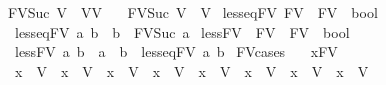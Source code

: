 \begin{isabellebody}
\ \ {\isachardoublequoteopen}FV{\isacharunderscore}{\kern0pt}Suc\ V{}\ {\isacharequal}{\kern0pt}\ {\isacharbraceleft}{\kern0pt}V{}{\isacharcomma}{\kern0pt}V{}{}{\isacharbraceright}{\kern0pt}{\isachardoublequoteclose}\ {\isacharbar}{\kern0pt}\isanewline
\ \ {\isachardoublequoteopen}FV{\isacharunderscore}{\kern0pt}Suc\ V{}{}\ {\isacharequal}{\kern0pt}\ {\isacharbraceleft}{\kern0pt}V{}{}{\isacharbraceright}{\kern0pt}{\isachardoublequoteclose}\isanewline
{}\isamarkupfalse%
\ less{\isacharunderscore}{\kern0pt}eq{\isacharunderscore}{\kern0pt}FV{\isacharcolon}{\kern0pt}{\isacharcolon}{\kern0pt}\ {\isachardoublequoteopen}FV\ {\isasymRightarrow}\ FV\ {\isasymRightarrow}\ bool{\isachardoublequoteclose}\ \isanewline
\ \ \ {\isachardoublequoteopen}less{\isacharunderscore}{\kern0pt}eq{\isacharunderscore}{\kern0pt}FV\ a\ b\ {\isacharequal}{\kern0pt}\ {\isacharparenleft}{\kern0pt}b\ {\isasymin}\ FV{\isacharunderscore}{\kern0pt}Suc\ a{\isacharparenright}{\kern0pt}{\isachardoublequoteclose}\isanewline
\isanewline
{}\isamarkupfalse%
\ less{\isacharunderscore}{\kern0pt}FV\ {\isacharcolon}{\kern0pt}{\isacharcolon}{\kern0pt}\ {\isachardoublequoteopen}FV\ {\isasymRightarrow}\ FV\ {\isasymRightarrow}\ bool{\isachardoublequoteclose}\isanewline
\ \ \ {\isachardoublequoteopen}less{\isacharunderscore}{\kern0pt}FV\ a\ b\ {\isacharequal}{\kern0pt}\ {\isacharparenleft}{\kern0pt}a\ {\isasymnoteq}\ b\ {\isasymand}\ less{\isacharunderscore}{\kern0pt}eq{\isacharunderscore}{\kern0pt}FV\ a\ b{\isacharparenright}{\kern0pt}{\isachardoublequoteclose}\isanewline
\isanewline
{}\isamarkupfalse%
\ FV{\isacharunderscore}{\kern0pt}cases{\isacharcolon}{\kern0pt}\isanewline
\ \ \ x{\isacharcolon}{\kern0pt}{\isacharcolon}{\kern0pt}FV\isanewline
\ \ \ {\isachardoublequoteopen}x\ {\isacharequal}{\kern0pt}\ V{}{\isachardoublequoteclose}\ {\isacharbar}{\kern0pt}\ {\isachardoublequoteopen}x\ {\isacharequal}{\kern0pt}\ V{}{\isachardoublequoteclose}\ {\isacharbar}{\kern0pt}\ {\isachardoublequoteopen}x\ {\isacharequal}{\kern0pt}\ V{}{\isachardoublequoteclose}\ {\isacharbar}{\kern0pt}\ {\isachardoublequoteopen}x\ {\isacharequal}{\kern0pt}\ V{}{\isachardoublequoteclose}\ {\isacharbar}{\kern0pt}\ {\isachardoublequoteopen}x\ {\isacharequal}{\kern0pt}\ V{}{\isachardoublequoteclose}\ {\isacharbar}{\kern0pt}\ {\isachardoublequoteopen}x\ {\isacharequal}{\kern0pt}\ V{}{\isachardoublequoteclose}\ {\isacharbar}{\kern0pt}\ {\isachardoublequoteopen}x\ {\isacharequal}{\kern0pt}\ V{}{\isachardoublequoteclose}\ {\isacharbar}{\kern0pt}\ {\isachardoublequoteopen}x\ {\isacharequal}{\kern0pt}\ V{}{\isachardoublequoteclose}\ \isanewline

\end{isabellebody}
